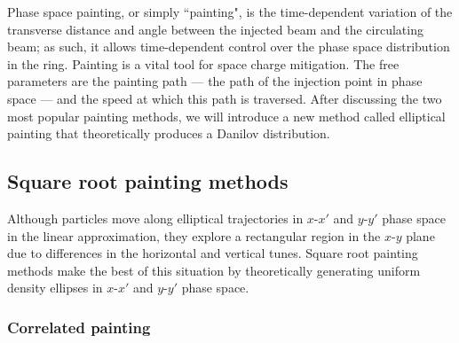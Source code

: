 Phase space painting, or simply ``painting", is the time-dependent variation of the transverse distance and angle between the injected beam and the circulating beam; as such, it allows time-dependent control over the phase space distribution in the ring. Painting is a vital tool for space charge mitigation. The free parameters are the painting path — the path of the injection point in phase space — and the speed at which this path is traversed. After discussing the two most popular painting methods, we will introduce a new method called elliptical painting that theoretically produces a Danilov distribution.


\subsection{Square root painting methods}

Although particles move along elliptical trajectories in $x$-$x'$ and $y$-$y'$ phase space in the linear approximation, they explore a rectangular region in the $x$-$y$ plane due to differences in the horizontal and vertical tunes. Square root painting methods make the best of this situation by theoretically generating uniform density ellipses in $x$-$x'$ and $y$-$y'$ phase space. 

\subsubsection{Correlated painting}

